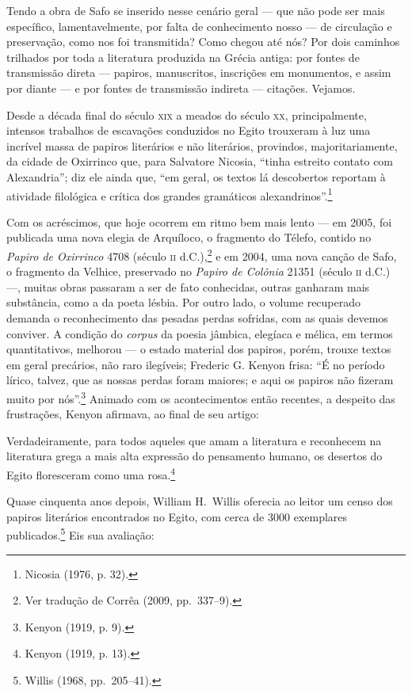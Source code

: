 Tendo a obra de Safo se inserido nesse cenário geral --- que não pode ser mais
específico, lamentavelmente, por falta de conhecimento nosso --- de circulação e
preservação, como nos foi transmitida? Como chegou até nós? Por dois caminhos
trilhados por toda a literatura produzida na Grécia antiga: por fontes de
transmissão direta --- papiros, manuscritos, inscrições em monumentos, e assim
por diante --- e por fontes de transmissão indireta --- citações. Vejamos. 

Desde a década final do século \textsc{xix} a meados do século \textsc{xx}, principalmente,
intensos trabalhos de escavações conduzidos no Egito trouxeram à luz uma
incrível massa de papiros literários e não literários, provindos,
majoritariamente, da cidade de Oxirrinco que, para Salvatore Nicosia, “tinha
estreito contato com Alexandria”; diz ele ainda que, “em geral, os
textos lá descobertos reportam à atividade filológica e crítica dos grandes
gramáticos alexandrinos”.\footnote{ Nicosia (1976, p. 32).}

Com os acréscimos, que hoje ocorrem em ritmo bem mais lento --- em 2005, foi
publicada uma nova elegia de Arquíloco, o fragmento do Télefo, contido no
\textit{Papiro de Oxirrinco} 4708 (século \textsc{ii} d.C.),\footnote{ Ver tradução de
Corrêa (2009, pp.~337--9).} e em 2004, uma nova canção de Safo, o fragmento da
Velhice, preservado no \textit{Papiro de Colônia} 21351 (século \textsc{ii} d.C.) ---,
muitas obras passaram a ser de fato conhecidas, outras ganharam mais
substância, como a da poeta lésbia. Por outro lado, o volume recuperado demanda
o reconhecimento das pesadas perdas sofridas, com as quais devemos conviver. A
condição do \textit{corpus} da poesia jâmbica, elegíaca e mélica, em termos
quantitativos, melhorou --- o estado material dos papiros, porém, trouxe textos
em geral precários, não raro ilegíveis; Frederic G. Kenyon frisa:
“É no período lírico, talvez, que as nossas perdas foram maiores; e aqui os
papiros não fizeram muito por nós”.\footnote{ Kenyon (1919, p. 9).} Animado com os acontecimentos então
recentes, a despeito das frustrações, Kenyon afirmava, ao final de seu
artigo: 

\begin{hedraquote}
Verdadeiramente, para todos aqueles que amam a literatura e reconhecem
na literatura grega a mais alta expressão do pensamento humano, os desertos do
Egito floresceram como uma rosa.\footnote{ Kenyon (1919, p. 13).}
\end{hedraquote}


Quase cinquenta anos depois, William H.~Willis oferecia ao
leitor um censo dos papiros literários encontrados no Egito, com cerca de 3000
exemplares publicados.\footnote{ Willis (1968, pp.~205--41).} Eis sua avaliação: 

